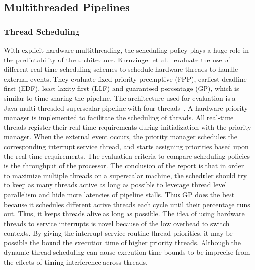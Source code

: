 \subsection{Multithreaded Pipelines}
\subsubsection{Thread Scheduling}
With explicit hardware multithreading, the scheduling policy plays a huge role in the predictability of the architecture.
Kreuzinger et al.~\cite{Kreuzinger2000RTmultithread} evaluate the use of different real time scheduling schemes to schedule hardware threads to handle external events. 
They evaluate fixed priority preemptive (FPP), earliest deadline first (EDF), least laxity first (LLF) and guaranteed percentage (GP), which is similar to time sharing the pipeline. 
The architecture used for evaluation is a Java multi-threaded superscalar pipeline with four threads~\cite{Kreuzinger2003multithreadeventhandle}. 
A hardware priority manager is implemented to facilitate the scheduling of threads. 
All real-time threads register their real-time requirements during initialization with the priority manager. 
When the external event occurs, the priority manager schedules the corresponding interrupt service thread, and starts assigning priorities based upon the real time requirements. 
The evaluation criteria to compare scheduling policies is the throughput of the processor. 
The conclusion of the report is that in order to maximize multiple threads on a superscalar machine, the scheduler should try to keep as many threads active as long as possible to leverage thread level parallelism and hide more latencies of pipeline stalls. 
Thus GP does the best because it schedules different active threads each cycle until their percentage runs out.
Thus, it keeps threads alive as long as possible. 
The idea of using hardware threads to service interrupts is novel because of the low overhead to switch contexts. 
By giving the interrupt service routine thread priorities, it may be possible the bound the execution time of higher priority threads. 
Although the dynamic thread scheduling can cause execution time bounds to be imprecise from the effects of timing interference across threads.  
  
